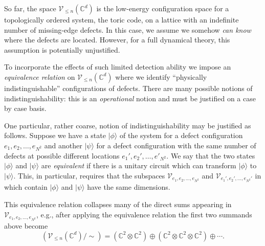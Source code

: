 So far, the space $\mathcal{V}_{\le n}(\mathbb{C}^d)$ is the low-energy configuration space for a topologically ordered system, the toric code, on a lattice with an indefinite number of missing-edge defects. In this case, we assume we somehow \emph{can know} where the defects are located. However, for a full dynamical theory, this assumption is potentially unjustified.

To incorporate the effects of such limited detection ability we impose an \emph{equivalence relation} on $\mathcal{V}_{\le n}(\mathbb{C}^d)$ where we identify ``physically indistinguishable'' configurations of defects. There are many possible notions of indistinguishability: this is an \emph{operational} notion and must be justified on a case by case basis. 

One particular, rather coarse, notion of indistinguishability may be justified as follows. Suppose we have a state $|\phi\rangle$ of the system for a defect configuration $e_1,e_2, \ldots, e_{N^2}$ and another $|\psi\rangle$ for a defect configuration with the same number of defects at possible different locations $e_1',e_2',\ldots, e'_{N^2}$. We say that the two states $|\phi\rangle$ and $|\psi\rangle$ are \emph{equivalent} if there is a unitary circuit which can transform $|\phi\rangle$ to $|\psi\rangle$. This, in particular, requires that the subspaces $\mathcal{V}_{e_1,e_2,\ldots,e_{N^2}}$ and $\mathcal{V}_{e_1',e_2',\ldots,e_{N^2}'}$ in which contain $|\phi\rangle$ and $|\psi\rangle$ have the same dimensions.

This equivalence relation collapses many of the direct sums appearing in $\mathcal{V}_{e_1,e_2,\ldots,e_{N^2}}$, e.g., after applying the equivalence relation the first two summands above become
\begin{equation}
	\left(\mathcal{V}_{\le n}(\mathbb{C}^d)/\sim\right) = (\mathbb{C}^2\otimes \mathbb{C}^2)\oplus (\mathbb{C}^2\otimes \mathbb{C}^2\otimes \mathbb{C}^2)\oplus \cdots.
\end{equation}



  
